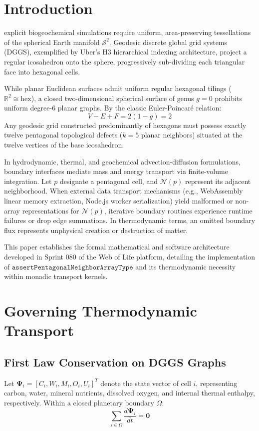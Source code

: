 \documentclass[10pt,journal,compsoc]{IEEEtran}
\begin{document}
\section{Introduction}
 explicit biogeochemical simulations require uniform, area-preserving tessellations of the spherical Earth manifold $\mathcal{S}^2$. Geodesic discrete global grid systems (DGGS), exemplified by Uber's H3 hierarchical indexing architecture, project a regular icosahedron onto the sphere, progressively sub-dividing each triangular face into hexagonal cells.

While planar Euclidean surfaces admit uniform regular hexagonal tilings ($\mathbb{R}^2 \cong \text{hex}$), a closed two-dimensional spherical surface of genus $g = 0$ prohibits uniform degree-6 planar graphs. By the classic Euler-Poincaré relation:
\begin{equation}
V - E + F = 2(1 - g) = 2
\end{equation}
Any geodesic grid constructed predominantly of hexagons must possess exactly twelve pentagonal topological defects ($k = 5$ planar neighbors) situated at the twelve vertices of the base icosahedron.

In hydrodynamic, thermal, and geochemical advection-diffusion formulations, boundary interfaces mediate mass and energy transport via finite-volume integration. Let $p$ designate a pentagonal cell, and $\mathcal{N}(p)$ represent its adjacent neighborhood. When external data transport mechanisms (e.g., WebAssembly linear memory extraction, Node.js worker serialization) yield malformed or non-array representations for $\mathcal{N}(p)$, iterative boundary routines experience runtime failures or drop edge summations. In thermodynamic terms, an omitted boundary flux represents unphysical creation or destruction of matter.

This paper establishes the formal mathematical and software architecture developed in Sprint 080 of the Web of Life platform, detailing the implementation of $\texttt{assertPentagonalNeighborArrayType}$ and its thermodynamic necessity within monadic transport kernels.

\section{Governing Thermodynamic Transport}

\subsection{First Law Conservation on DGGS Graphs}
Let $\mathbf{\Psi}_i = [C_i, W_i, M_i, O_i, U_i]^T$ denote the state vector of cell $i$, representing carbon, water, mineral nutrients, dissolved oxygen, and internal thermal enthalpy, respectively. Within a closed planetary boundary $\Omega$:
\begin{equation}
\sum_{i \in \Omega} \frac{d\mathbf{\Psi}_i}{dt} = \mathbf{0}
\end{equation}
\end{document}
